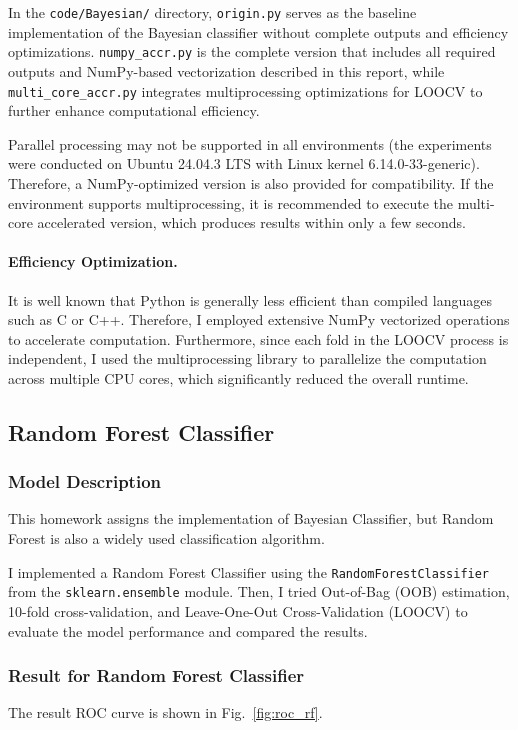 \documentclass[12pt,a4paper]{article}
\begin{document}
In the \texttt{code/Bayesian/} directory, \texttt{origin.py} serves as the baseline implementation of the Bayesian classifier without complete outputs and efficiency optimizations. \texttt{numpy\_accr.py} is the complete version that includes all required outputs and NumPy-based vectorization described in this report, while \texttt{multi\_core\_accr.py} integrates multiprocessing optimizations for LOOCV to further enhance computational efficiency.

Parallel processing may not be supported in all environments (the experiments were conducted on Ubuntu 24.04.3 LTS with Linux kernel 6.14.0-33-generic). Therefore, a NumPy-optimized version is also provided for compatibility. If the environment supports multiprocessing, it is recommended to execute the multi-core accelerated version, which produces results within only a few seconds.



\paragraph{Efficiency Optimization.}
It is well known that Python is generally less efficient than compiled languages such as C or C++. Therefore, I employed extensive NumPy vectorized operations to accelerate computation. Furthermore, since each fold in the LOOCV process is independent, I used the multiprocessing library to parallelize the computation across multiple CPU cores, which significantly reduced the overall runtime.


\subsection{Random Forest Classifier}
\subsubsection{Model Description}
This homework assigns the implementation of Bayesian Classifier, but Random Forest is also a widely used classification algorithm.

I implemented a Random Forest Classifier using the \texttt{RandomForestClassifier} from the \texttt{sklearn.ensemble} module. Then, I tried Out-of-Bag (OOB) estimation, 10-fold cross-validation, and Leave-One-Out Cross-Validation (LOOCV) to evaluate the model performance and compared the results. 


\subsubsection{Result for Random Forest Classifier}
The result ROC curve is shown in Fig.~\ref{fig:roc_rf}.
\end{document}
